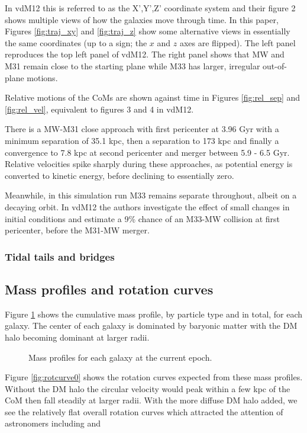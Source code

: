 \documentclass[twocolumn]{aastex63}
\begin{document}
In vdM12 this is referred to as the X',Y',Z' coordinate system and their figure 2 shows multiple views of how the galaxies move through time. In this paper, Figures \ref{fig:traj_xy} and  \ref{fig:traj_z} show some alternative views in essentially the same coordinates (up to a sign; the $x$ and $z$ axes are flipped). The left panel reproduces the top left panel of vdM12. The right panel shows that MW and M31 remain close to the starting plane while M33 has larger, irregular out-of-plane motions.

Relative motions of the CoMs are shown against time in Figures \ref{fig:rel_sep} and \ref{fig:rel_vel}, equivalent to figures 3 and 4 in vdM12.


There is a MW-M31 close approach with first pericenter at 3.96 Gyr with a minimum separation of 35.1 kpc, then a separation to 173 kpc and finally a convergence to 7.8 kpc at second pericenter and merger between 5.9 - 6.5 Gyr. Relative velocities spike sharply during these approaches, as potential energy is converted to kinetic energy, before declining to essentially zero.

Meanwhile, in this simulation run M33 remains separate throughout, albeit on a decaying orbit. In vdM12 the authors investigate the effect of small changes in initial conditions and estimate a 9\% chance of an M33-MW collision at first pericenter, before the M31-MW merger.

\subsubsection{Tidal tails and bridges}

\subsection{Mass profiles and rotation curves}

Figure \ref{fig:massprof0} shows the cumulative mass profile, by particle type and in total, for each galaxy. The center of each galaxy is dominated by baryonic matter with the DM halo becoming dominant at larger radii.
\begin{figure}[bht!]
	\caption{Mass profiles for each galaxy at the current epoch.
		\label{fig:massprof0}}
\end{figure}


Figure \ref{fig:rotcurve0} shows the rotation curves expected from these mass profiles. Without the DM halo the circular velocity would peak within a few kpc of the CoM then fall steadily at larger radii. With the more diffuse DM halo added, we see the relatively flat overall rotation curves which attracted the attention of astronomers including \citet{zwicky_rotverschiebung_1933} and \citet{rubin_rotation_1970}
\end{document}

